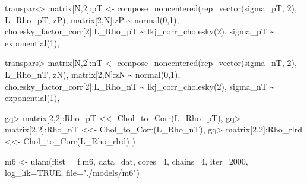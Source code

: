 \documentclass[
]{article}
\newenvironment{Shaded}{\begin{snugshade}}{\end{snugshade}}
\newcommand{\AttributeTok}[1]{\textcolor[rgb]{0.77,0.63,0.00}{#1}}
\newcommand{\ConstantTok}[1]{\textcolor[rgb]{0.00,0.00,0.00}{#1}}
\newcommand{\DecValTok}[1]{\textcolor[rgb]{0.00,0.00,0.81}{#1}}
\newcommand{\FunctionTok}[1]{\textcolor[rgb]{0.00,0.00,0.00}{#1}}
\newcommand{\NormalTok}[1]{#1}
\newcommand{\OtherTok}[1]{\textcolor[rgb]{0.56,0.35,0.01}{#1}}
\newcommand{\SpecialCharTok}[1]{\textcolor[rgb]{0.00,0.00,0.00}{#1}}
\newcommand{\StringTok}[1]{\textcolor[rgb]{0.31,0.60,0.02}{#1}}
\begin{document}
\begin{Shaded}
\begin{Highlighting}[]
\NormalTok{    transpars}\SpecialCharTok{\textgreater{}}\NormalTok{ matrix[N,}\DecValTok{2}\NormalTok{]}\SpecialCharTok{:}\NormalTok{pT }\OtherTok{\textless{}{-}} 
        \FunctionTok{compose\_noncentered}\NormalTok{(}\FunctionTok{rep\_vector}\NormalTok{(sigma\_pT, }\DecValTok{2}\NormalTok{), L\_Rho\_pT, zP),}
\NormalTok{    matrix[}\DecValTok{2}\NormalTok{,N]}\SpecialCharTok{:}\NormalTok{zP }\SpecialCharTok{\textasciitilde{}} \FunctionTok{normal}\NormalTok{(}\DecValTok{0}\NormalTok{,}\DecValTok{1}\NormalTok{),}
\NormalTok{    cholesky\_factor\_corr[}\DecValTok{2}\NormalTok{]}\SpecialCharTok{:}\NormalTok{L\_Rho\_pT }\SpecialCharTok{\textasciitilde{}} \FunctionTok{lkj\_corr\_cholesky}\NormalTok{(}\DecValTok{2}\NormalTok{),}
\NormalTok{    sigma\_pT }\SpecialCharTok{\textasciitilde{}} \FunctionTok{exponential}\NormalTok{(}\DecValTok{1}\NormalTok{),}

\NormalTok{    transpars}\SpecialCharTok{\textgreater{}}\NormalTok{ matrix[N,}\DecValTok{2}\NormalTok{]}\SpecialCharTok{:}\NormalTok{nT }\OtherTok{\textless{}{-}} 
        \FunctionTok{compose\_noncentered}\NormalTok{(}\FunctionTok{rep\_vector}\NormalTok{(sigma\_nT, }\DecValTok{2}\NormalTok{), L\_Rho\_nT, zN),}
\NormalTok{    matrix[}\DecValTok{2}\NormalTok{,N]}\SpecialCharTok{:}\NormalTok{zN }\SpecialCharTok{\textasciitilde{}} \FunctionTok{normal}\NormalTok{(}\DecValTok{0}\NormalTok{,}\DecValTok{1}\NormalTok{),}
\NormalTok{    cholesky\_factor\_corr[}\DecValTok{2}\NormalTok{]}\SpecialCharTok{:}\NormalTok{L\_Rho\_nT }\SpecialCharTok{\textasciitilde{}} \FunctionTok{lkj\_corr\_cholesky}\NormalTok{(}\DecValTok{2}\NormalTok{),}
\NormalTok{    sigma\_nT }\SpecialCharTok{\textasciitilde{}} \FunctionTok{exponential}\NormalTok{(}\DecValTok{1}\NormalTok{),}

\NormalTok{    gq}\SpecialCharTok{\textgreater{}}\NormalTok{ matrix[}\DecValTok{2}\NormalTok{,}\DecValTok{2}\NormalTok{]}\SpecialCharTok{:}\NormalTok{Rho\_pT }\OtherTok{\textless{}\textless{}{-}} \FunctionTok{Chol\_to\_Corr}\NormalTok{(L\_Rho\_pT),}
\NormalTok{    gq}\SpecialCharTok{\textgreater{}}\NormalTok{ matrix[}\DecValTok{2}\NormalTok{,}\DecValTok{2}\NormalTok{]}\SpecialCharTok{:}\NormalTok{Rho\_nT }\OtherTok{\textless{}\textless{}{-}} \FunctionTok{Chol\_to\_Corr}\NormalTok{(L\_Rho\_nT),}
\NormalTok{    gq}\SpecialCharTok{\textgreater{}}\NormalTok{ matrix[}\DecValTok{2}\NormalTok{,}\DecValTok{2}\NormalTok{]}\SpecialCharTok{:}\NormalTok{Rho\_rlrd }\OtherTok{\textless{}\textless{}{-}} \FunctionTok{Chol\_to\_Corr}\NormalTok{(L\_Rho\_rlrd)}
\NormalTok{)}

\NormalTok{m6 }\OtherTok{\textless{}{-}} \FunctionTok{ulam}\NormalTok{(}\AttributeTok{flist =}\NormalTok{ f.m6, }
           \AttributeTok{data=}\NormalTok{dat, }
           \AttributeTok{cores=}\DecValTok{4}\NormalTok{,}
           \AttributeTok{chains=}\DecValTok{4}\NormalTok{,}
           \AttributeTok{iter=}\DecValTok{2000}\NormalTok{,}
           \AttributeTok{log\_lik=}\ConstantTok{TRUE}\NormalTok{,}
           \AttributeTok{file=}\StringTok{"./models/m6"}\NormalTok{)}
\end{Highlighting}
\end{Shaded}
\end{document}
